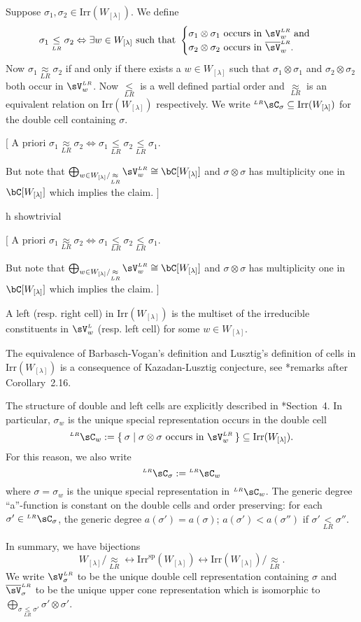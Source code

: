 \documentclass[12pt,a4paper]{amsart}
\newcommand{\trivial}[2][]{\if\relax\detokenize{#1}\relax
  {%
      \color{orange} \vspace{0em} $[$  #2 $]$
      \color{black}
  }
  \else
\ifx#1h
\ifcsname showtrivial\endcsname
{%
    \color{orange} \vspace{0em}  $[$ #2 $]$
    \color{black}
}
\fi
\else {\red Wrong argument!} \fi
\fi
}
\numberwithin{equation}{section}
\theoremstyle{remark}
\def\Irr{\mathrm{Irr}}
\def\Irrsp{\mathrm{Irr}^{\text{sp}}}
\def\Wlam{W_{[\lambda]}}
\def\LRC{{}^{\scriptscriptstyle LR}\sC}
\def\bVLR{{\overline{\sV}}^{\scriptscriptstyle LR}}
\def\VL{{\sV}^{\scriptscriptstyle L}}
\def\VLR{{\sV}^{\scriptscriptstyle LR}}
\def\lneqLR{\mathrel{\mathop{<}\limits_{\scriptscriptstyle LR}}}
\def\leqLR{\mathrel{\mathop{\leq}\limits_{\scriptscriptstyle LR}}}
\def\approxLR{\mathrel{\mathop{\approx}\limits_{\scriptscriptstyle LR}}}
\begin{document}
Suppose $\sigma_{1}, \sigma_{2}\in \Irr(W_{[\lambda]})$. We define
\[
  \sigma_{1}\leqLR \sigma_{2} \Leftrightarrow
  \exists w\in W_{[\lambda]} \text{ such that }
  \begin{cases}
  \sigma_{1} \otimes \sigma_{1} \text{ occurs in } \VLR_{w}
  \text{ and } \\
  \sigma_{2} \otimes \sigma_{2} \text{ occurs in } \bVLR_{w}.
\end{cases}
\]
Now $\sigma_{1}\approxLR \sigma_{2}$ if and only if there exists a
$w\in W_{[\lambda]}$ such that $\sigma_{1} \otimes \sigma_{1}$ and
$\sigma_{2} \otimes \sigma_{2}$ both occur in $\VLR_{w}$.
Now $\leqLR$ is a well
defined partial order and  $\approxLR$ is an equivalent
relation on $\Irr(W_{[\lambda]})$ respectively.
We write $\LRC_{\sigma}\subseteq \Irr(\Wlam)$ for the double cell containing
$\sigma$.
\trivial[]{
  A priori $\sigma_{1}\approxLR \sigma_{2}\Leftrightarrow
  \sigma_{1}\leqLR \sigma_{2}\leqLR \sigma_{1}$.

  But note that $\bigoplus_{w\in \Wlam/\approxLR} \VLR_{w} \cong \bC[\Wlam]$
  and $\sigma\otimes \sigma$ has multiplicity one in $\bC[\Wlam]$
  which implies the claim.
}

A left (resp. right cell) in $\Irr(\Wlam)$ is the multiset of the irreducible
constituents in $\VL_{w}$  (resp. left cell) for some $w\in \Wlam$.

The equivalence of Barbasch-Vogan's definition  and
  Lusztig's definition of cells in $\Irr(\Wlam)$ is a consequence of
  Kazadan-Lusztig conjecture, see \cite{BV2}*{remarks after Corollary~2.16}.

The structure of double and left cells are explicitly described in
\cite{Lu}*{Section~4}.
In particular, $\sigma_{w}$ is the unique special representation occurs
in the double cell
\[
  \LRC_{w}:= \Set{\sigma| \sigma\otimes \sigma \text{ occurs in } \VLR_{w}}
  \subseteq \Irr(\Wlam).
\]
For this reason, we also write
\[
  \LRC_{\sigma}:=\LRC_{w}
\]
where $\sigma=\sigma_{w}$ is the unique special representation in $\LRC_{w}$.
The generic degree ``a''-function is constant on the double cells and order
preserving: for each $\sigma'\in
\LRC_{\sigma}$, the generic degree $a(\sigma')=a(\sigma)$;
$a(\sigma')<a(\sigma'')$ if $\sigma'\lneqLR \sigma''$.

In summary, we have bijections
\[
  \Wlam/\approxLR \longleftrightarrow\Irrsp(\Wlam)\longleftrightarrow \Irr(\Wlam)/\approxLR.
\]
We write $\VLR_{\sigma}$ to be the unique double cell representation
containing $\sigma$ and $\bVLR_{\sigma}$ to be the unique upper cone
representation which is isomorphic to
$\bigoplus_{\sigma\leqLR \sigma'}\sigma'\otimes \sigma'$.
\end{document}
